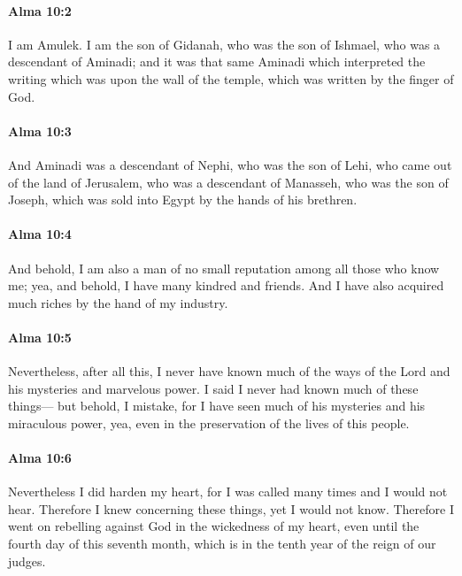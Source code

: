 		\paragraph{Alma 10:2} %
			\label{ALMA-10-2}

			I am Amulek.
			I am the son of Gidanah,
			who was the son of Ishmael,
			who was a descendant of Aminadi;
			and it was that same Aminadi
			which interpreted the writing which was upon the wall of the temple,
			which was written by the finger of God.

		\paragraph{Alma 10:3} %
			\label{ALMA-10-3}

			And Aminadi was a descendant of Nephi,
			who was the son of Lehi,
			who came out of the land of Jerusalem,
			who was a descendant of Manasseh,
			who was the son of Joseph,
			which was sold into Egypt by the hands of his brethren.

		\paragraph{Alma 10:4} %
			\label{ALMA-10-4}

			And behold, I am also a man of no small reputation
			among all those who know me;
			yea, and behold, I have many kindred and friends.
			And I have also acquired much riches by the hand of my industry.

		\paragraph{Alma 10:5} %
			\label{ALMA-10-5}

			Nevertheless, after all this, I never have known much of the ways of the Lord
			and his mysteries and marvelous power.
			I said I never had known much of these things---
			but behold, I mistake,
			for I have seen much of his mysteries and his miraculous power,
			yea, even in the preservation of the lives of this people.

		\paragraph{Alma 10:6} %
			\label{ALMA-10-6}

			Nevertheless I did harden my heart,
			for I was called many times and I would not hear.
			Therefore I knew concerning these things,
			yet I would not know.
			Therefore I went on rebelling against God in the wickedness of my heart,
			even until the fourth day of this seventh month,
			which is in the tenth year of the reign of our judges.

